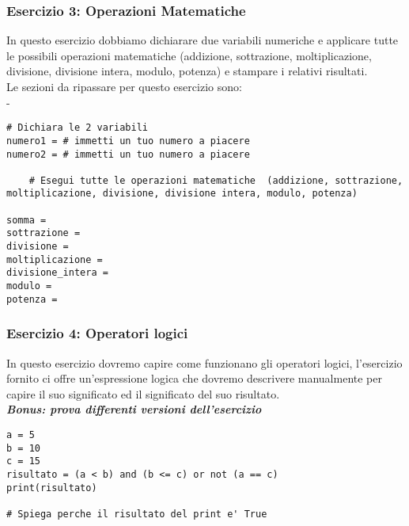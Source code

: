 \subsubsection{Esercizio 3: Operazioni Matematiche}\label{esercizioFond:3}
In questo esercizio dobbiamo dichiarare due variabili numeriche e applicare tutte le possibili operazioni matematiche  (addizione, sottrazione, moltiplicazione, divisione, divisione intera, modulo, potenza) e stampare i relativi risultati.\\
Le sezioni da ripassare per questo esercizio sono:\\
- 

\begin{lstlisting}
# Dichiara le 2 variabili
numero1 = # immetti un tuo numero a piacere
numero2 = # immetti un tuo numero a piacere

    # Esegui tutte le operazioni matematiche  (addizione, sottrazione, moltiplicazione, divisione, divisione intera, modulo, potenza)

somma = 
sottrazione = 
divisione = 
moltiplicazione = 
divisione_intera = 
modulo = 
potenza = 

\end{lstlisting}

\subsubsection{Esercizio 4: Operatori logici}\label{esercizioFond:4}
In questo esercizio dovremo capire come funzionano gli operatori logici, l'esercizio fornito ci offre un'espressione logica che dovremo descrivere manualmente per capire il suo significato ed il significato del suo risultato.\\
\textbf{\textit {Bonus: prova differenti versioni dell'esercizio}}

\begin{lstlisting}
a = 5
b = 10
c = 15
risultato = (a < b) and (b <= c) or not (a == c)
print(risultato)

# Spiega perche il risultato del print e' True
\end{lstlisting}

